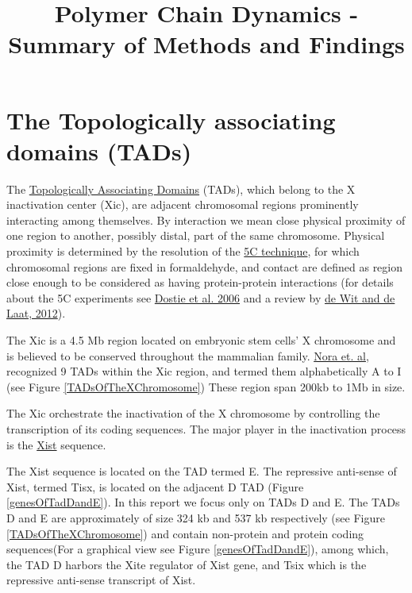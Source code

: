 \documentclass[12pt]{paper}
\begin{document}
\title{Polymer Chain Dynamics - Summary of Methods and Findings}
\maketitle
\tableofcontents

\section{The Topologically associating domains (TADs)}
The \href{http://www.nature.com/nature/journal/v485/n7398/full/nature11049.html}{Topologically Associating Domains} (TADs), which belong to the X inactivation center (Xic), are adjacent chromosomal regions prominently interacting among themselves. By interaction we mean close physical proximity of one region to another, possibly distal, part of the same chromosome. Physical proximity is determined by the resolution of the \href{http://en.wikipedia.org/wiki/Chromosome_conformation_capture#Carbon-Copy_Chromosome_Conformation_Capture_.285C.29}{5C technique}, for which chromosomal regions are fixed in formaldehyde, and contact are defined as region close enough to be considered as having protein-protein interactions (for details about the 5C experiments see \href{http://genome.cshlp.org/content/16/10/1299.long}{Dostie et al. 2006} and a review by \href{http://genesdev.cshlp.org/content/26/1/11/F1.expansion.html}{de Wit and de Laat, 2012}). 

The Xic is a 4.5 Mb region located on embryonic stem cells' X chromosome and is believed to be conserved throughout the mammalian family.  \href{http://www.nature.com/nature/journal/v485/n7398/full/nature11049.html}{Nora et. al}, recognized 9 TADs within the Xic region, and termed them alphabetically A to I (see Figure \ref{TADsOfTheXChromosome}) These region span 200kb to 1Mb in size. 

The Xic orchestrate the inactivation of the X chromosome by controlling the transcription of its coding sequences. The major player in the inactivation process is the \href{http://en.wikipedia.org/wiki/XIST_(gene)#cite_note-2}{Xist} sequence.  

The Xist sequence is located on the TAD termed E. The repressive anti-sense of Xist, termed Tisx, is located on the adjacent D TAD (Figure \ref{genesOfTadDandE}). In this report we focus only on TADs D and E. The TADs D and E are approximately of size 324 kb and 537 kb respectively (see Figure \ref{TADsOfTheXChromosome}) and contain non-protein and protein coding sequences(For a graphical view see Figure \ref{genesOfTadDandE}), among which, the TAD D harbors the Xite regulator of Xist gene, and Tsix which is the repressive anti-sense transcript of Xist. 
\end{document}
